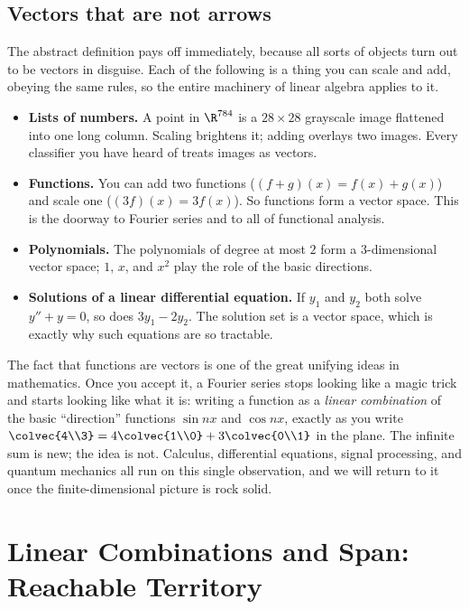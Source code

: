 \subsection{Vectors that are not arrows}

The abstract definition pays off immediately, because all sorts of objects turn out to be vectors in
disguise. Each of the following is a thing you can scale and add, obeying the same rules, so the
entire machinery of linear algebra applies to it.

\begin{itemize}
  \item \textbf{Lists of numbers.} A point in $\R^{784}$ is a $28\times 28$ grayscale image flattened
  into one long column. Scaling brightens it; adding overlays two images. Every classifier you have
  heard of treats images as vectors.
  \item \textbf{Functions.} You can add two functions ($(f+g)(x)=f(x)+g(x)$) and scale one
  ($(3f)(x)=3f(x)$). So functions form a vector space. This is the doorway to Fourier series and to
  all of functional analysis.
  \item \textbf{Polynomials.} The polynomials of degree at most $2$ form a $3$-dimensional vector
  space; $1$, $x$, and $x^2$ play the role of the basic directions.
  \item \textbf{Solutions of a linear differential equation.} If $y_1$ and $y_2$ both solve
  $y'' + y = 0$, so does $3y_1 - 2y_2$. The solution set is a vector space, which is exactly why such
  equations are so tractable.
\end{itemize}

\begin{connectionbox}
The fact that functions are vectors is one of the great unifying ideas in mathematics. Once you accept
it, a Fourier series stops looking like a magic trick and starts looking like what it is: writing a
function as a \emph{linear combination} of the basic ``direction'' functions $\sin nx$ and $\cos nx$,
exactly as you write $\colvec{4\\3} = 4\colvec{1\\0} + 3\colvec{0\\1}$ in the plane. The infinite
sum is new; the idea is not. Calculus, differential equations, signal processing, and quantum
mechanics all run on this single observation, and we will return to it once the finite-dimensional
picture is rock solid.
\end{connectionbox}

\section{Linear Combinations and Span: Reachable Territory}

